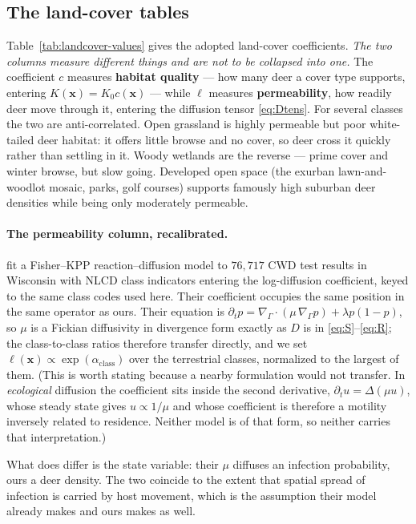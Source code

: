 \documentclass[11pt]{article}
\newcommand{\Grad}{\nabla_\Gamma}
\newcommand{\Div}{\nabla_\Gamma\cdot}
\begin{document}
\subsection{The land-cover tables}
\label{sec:params-landcover}

Table~\ref{tab:landcover-values} gives the adopted land-cover coefficients. \emph{The two columns measure different things and are not to be collapsed into one.} The coefficient $c$ measures \textbf{habitat quality} --- how many deer a cover type supports, entering $K(\mathbf{x}) = K_0 c(\mathbf{x})$ --- while $\ell$ measures \textbf{permeability}, how readily deer move through it, entering the diffusion tensor \eqref{eq:Dtens}. For several classes the two are anti-correlated. Open grassland is highly permeable but poor white-tailed deer habitat: it offers little browse and no cover, so deer cross it quickly rather than settling in it. Woody wetlands are the reverse --- prime cover and winter browse, but slow going. Developed open space (the exurban lawn-and-woodlot mosaic, parks, golf courses) supports famously high suburban deer densities while being only moderately permeable.

\paragraph{The permeability column, recalibrated.} \citet{MandujanoReyes2025} fit a Fisher--KPP reaction--diffusion model to $76{,}717$ CWD test results in Wisconsin with NLCD class indicators entering the log-diffusion coefficient, keyed to the same class codes used here. Their coefficient occupies the same position in the same operator as ours. Their equation is $\partial_t p = \Div(\mu\,\Grad p) + \lambda p(1-p)$, so $\mu$ is a Fickian diffusivity in divergence form exactly as $D$ is in \eqref{eq:S}--\eqref{eq:R}; the class-to-class ratios therefore transfer directly, and we set $\ell(\mathbf{x}) \propto \exp(\alpha_{\text{class}})$ over the terrestrial classes, normalized to the largest of them. (This is worth stating because a nearby formulation would not transfer. In \emph{ecological} diffusion the coefficient sits inside the second derivative, $\partial_t u = \Delta(\mu u)$, whose steady state gives $u \propto 1/\mu$ and whose coefficient is therefore a motility inversely related to residence. Neither model is of that form, so neither carries that interpretation.)

What does differ is the state variable: their $\mu$ diffuses an infection probability, ours a deer density. The two coincide to the extent that spatial spread of infection is carried by host movement, which is the assumption their model already makes and ours makes as well.
\end{document}
